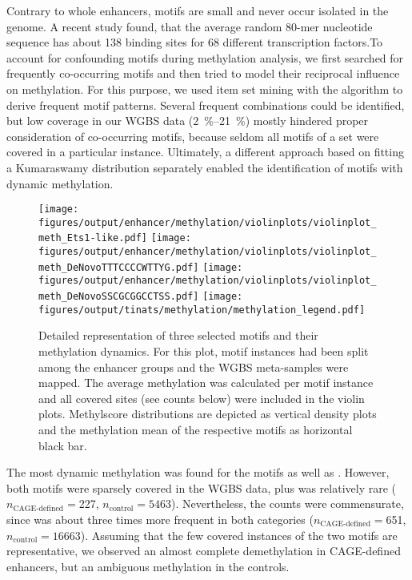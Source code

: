 Contrary to whole enhancers, motifs are small and never occur isolated in the genome. A recent study found, that the average random 80-mer nucleotide sequence has about 138 binding sites for 68 different transcription factors\cite{DeBoer2019}.To account for confounding motifs during methylation analysis, we first searched for frequently co-occurring motifs and then tried to model their reciprocal influence on methylation. For this purpose, we used item set mining with the  algorithm\cite{Agrawal1994a} to derive frequent motif patterns. Several frequent combinations could be identified, but low coverage in our WGBS data (\SIrange{2}{21}{\percent}) mostly hindered proper consideration of co-occurring motifs, because seldom all motifs of a set were covered in a particular instance. Ultimately, a different approach based on fitting a Kumaraswamy distribution separately enabled the identification of motifs with dynamic methylation\supple.

\begin{figure}[!htb]
	\centering
	\texttt{[image: figures/output/enhancer/methylation/violinplots/violinplot\_meth\_Ets1-like.pdf]} \texttt{[image: figures/output/enhancer/methylation/violinplots/violinplot\_meth\_DeNovoTTTCCCCWTTYG.pdf]}
	\texttt{[image: figures/output/enhancer/methylation/violinplots/violinplot\_meth\_DeNovoSSCGCGGCCTSS.pdf]} 
	\texttt{[image: figures/output/tinats/methylation/methylation\_legend.pdf]} 
	\caption{Detailed representation of three selected motifs and their methylation dynamics. For this plot, motif instances had been split among the enhancer groups and the WGBS meta-samples were mapped. The average methylation was calculated per motif instance and all covered sites (see counts below) were included in the violin plots. Methylscore distributions are depicted as vertical density plots and the methylation mean of the respective motifs as horizontal black bar.}
	\label{fig:enhancers:motifs:violinplot_meth_motifs}
\end{figure}

The most dynamic methylation was found for the motifs \motifetsone as well as \motifxc {} . However, both motifs were sparsely covered in the WGBS data, plus \motifxc was relatively rare ($n_{\text{CAGE-defined}}=$\num{227}, $n_{\text{control}}= 5463$). Nevertheless, the counts were commensurate, since \motifetsone was about three times more frequent in both categories ($n_{\text{CAGE-defined}}=$\num{651}, $n_{\text{control}}= 16663$). Assuming that the few covered instances of the two motifs are representative, we observed an almost complete demethylation in CAGE-defined enhancers, but an ambiguous methylation in the controls. 

